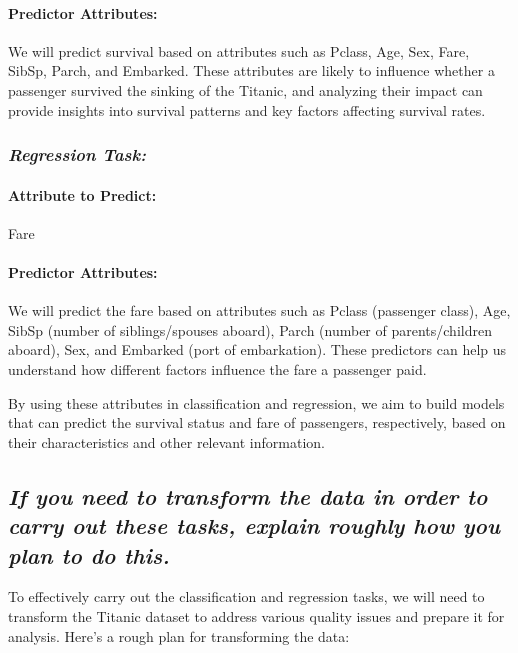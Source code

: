 \documentclass[twoside,11pt]{article}
\makeatletter
\let\@oldsubsection\subsection
\renewcommand\subsection[1]{\@oldsubsection*{\textit{#1}}}
\let\@oldsubsubsection\subsubsection
\renewcommand\subsubsection[1]{\@oldsubsubsection*{\textit{#1}}}
\makeatother
\begin{document}
\paragraph{Predictor Attributes:} We will predict survival based on attributes such as Pclass, Age, Sex, Fare, SibSp, Parch, and Embarked. These attributes are likely to influence whether a passenger survived the sinking of the Titanic, and analyzing their impact can provide insights into survival patterns and key factors affecting survival rates.

\subsubsection{Regression Task:}

\paragraph{Attribute to Predict:} Fare

\paragraph{Predictor Attributes:} We will predict the fare based on attributes such as Pclass (passenger class), Age, SibSp (number of siblings/spouses aboard), Parch (number of parents/children aboard), Sex, and Embarked (port of embarkation). These predictors can help us understand how different factors influence the fare a passenger paid.

By using these attributes in classification and regression, we aim to build models that can predict the survival status and fare of passengers, respectively, based on their characteristics and other relevant information.

\subsection{If you need to transform the data in order to carry out these tasks, explain roughly how you plan to do this.}
To effectively carry out the classification and regression tasks, we will need to transform the Titanic dataset to address various quality issues and prepare it for analysis. Here’s a rough plan for transforming the data:
\end{document}
